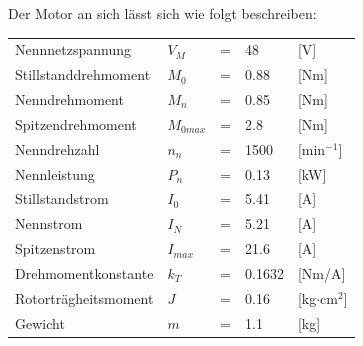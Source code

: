 Der Motor an sich lässt sich wie folgt beschreiben:

\begin{tabular}{lllll}
Nennnetzspannung & $V_M$ & = & 48 & [V]\\
Stillstanddrehmoment & $M_0$ & = & 0.88 & [Nm]\\
Nenndrehmoment & $M_n$ & = & 0.85 & [Nm]\\
Spitzendrehmoment & $M_{0max}$ & = & 2.8 & [Nm]\\
Nenndrehzahl & $n_n$ & = & 1500 & [min$^{-1}$]\\
Nennleistung & $P_n$ & = & 0.13 & [kW]\\
Stillstandstrom & $I_0$ & = & 5.41 & [A]\\
Nennstrom & $I_N$ & = & 5.21 & [A]\\
Spitzenstrom & $I_{max}$ & = & 21.6 & [A]\\
Drehmomentkonstante & $k_T$ & = & 0.1632 & [Nm/A]\\
Rotorträgheitsmoment & $J$ & = & 0.16 & [kg$\cdot$cm$^2$]\\
Gewicht & $m$ & = & 1.1 & [kg]\\
\end{tabular}